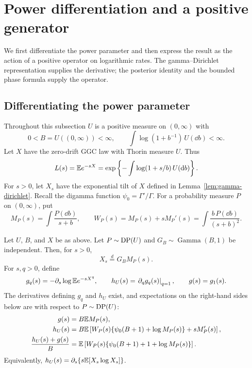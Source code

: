 \section{Power differentiation and a positive generator}
\label{sec:tangent}

We first differentiate the power parameter and then express the result as the action of a positive operator on logarithmic rates.
The gamma--Dirichlet representation supplies the derivative; the posterior identity and the bounded phase formula supply the operator.

\subsection{Differentiating the power parameter}

Throughout this subsection $U$ is a positive measure on $(0,\infty)$ with
\begin{equation}
 0<B=U((0,\infty))<\infty,\qquad
 \int\log(1+b^{-1})\,U(\dd b)<\infty.
 \label{eq:finite-admissible}
\end{equation}
Let $X$ have the zero-drift GGC law with Thorin measure $U$.
Thus
\[
 L(s)=\mathbb E e^{-sX}
 =\exp\left\{-\int\log(1+s/b)\,U(\mathop{}\!\mathrm d b)\right\}.
\]
For $s>0$, let $X_s$ have the exponential tilt of $X$ defined in Lemma~\ref{lem:gamma-dirichlet}.
Recall the digamma function $\psi_0=\Gamma'/\Gamma$.
For a probability measure $P$ on $(0,\infty)$, put
\begin{equation}
 M_P(s)=\int\frac{P(\dd b)}{s+b},\qquad
 W_P(s)=M_P(s)+sM_P'(s)=\int\frac{b\,P(\dd b)}{(s+b)^2}.
 \label{eq:MW}
\end{equation}

\begin{lemma}
\label{lem:tangent}
Let $U$, $B$, and $X$ be as above.
Let $P\sim\operatorname{DP}(U)$ and $G_B\sim\operatorname{Gamma}(B,1)$ be independent.
Then, for $s>0$,
\begin{equation}
 X_s\overset d=G_BM_P(s).
 \label{eq:tilt-gamma-dirichlet}
\end{equation}
For $s,q>0$, define
\[
 g_q(s)=-\partial_s\log\mathbb E e^{-sX^q},\qquad
 h_U(s)=\left.\partial_q g_q(s)\right|_{q=1},\qquad g(s)=g_1(s).
\]
The derivatives defining $g_q$ and $h_U$ exist, and expectations on the right-hand sides below are with respect to $P\sim\operatorname{DP}(U)$:
\begin{align}
 g(s)&=B\mathbb E M_P(s),\label{eq:g-dirichlet}\\
 h_U(s)&=B\mathbb E\left[
 W_P(s)\{\psi_0(B+1)+\log M_P(s)\}+sM_P'(s)
 \right],\label{eq:tangent}\\
 \frac{h_U(s)+g(s)}B
 &=\mathbb E\left[W_P(s)\{\psi_0(B+1)+1+\log M_P(s)\}\right].
 \label{eq:normalized-tangent}
\end{align}
Equivalently, $h_U(s)=\partial_s\{s\mathbb E[X_s\log X_s]\}$.
\end{lemma}

